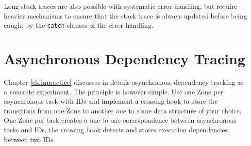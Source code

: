 Long stack traces are also possible with systematic error handling, but require heavier mechanisms to ensure that the stack trace is always updated before being caught by the \lstinline{catch} clauses of the error handling.

\section{Asynchronous Dependency Tracing}

Chapter \ref{ch:inpractice} discusses in details asynchronous dependency tracking as a concrete experiment. The principle is however simple. Use one Zone per asynchronous task with IDs and implement a crossing hook to store the transitions from one Zone to another one to some data structure of your choice. One Zone per task creates a one-to-one correspondence between asynchronous tasks and IDs, the crossing hook detects and stores execution dependencies between two IDs.

